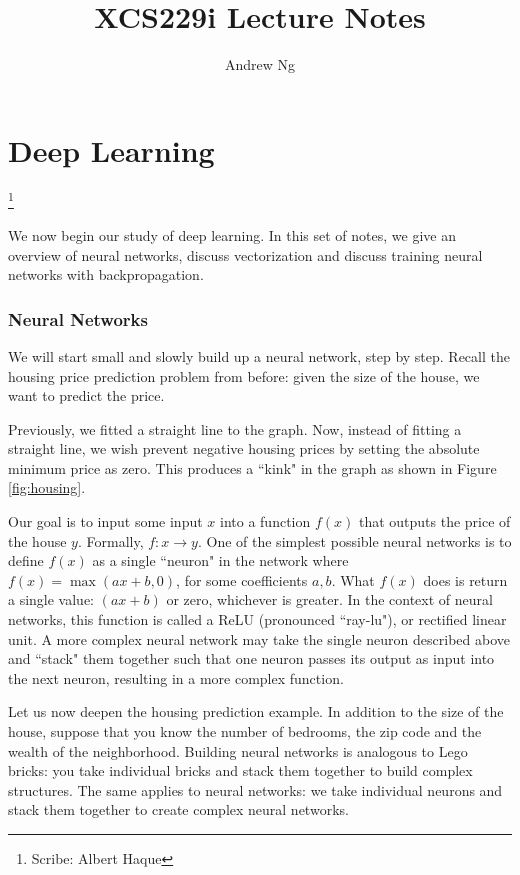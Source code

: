 \documentclass{article}
\numberwithin{equation}{section}
\newcommand\blfootnote[1]{%
	\begingroup
	\renewcommand\thefootnote{}\footnote{#1}%
	\addtocounter{footnote}{-1}%
	\endgroup
}
\begin{document}
\title{XCS229i Lecture Notes}
\author{Andrew Ng}
\date{}
\maketitle

\part*{Deep Learning}\blfootnote{Scribe: Albert Haque}

\noindent We now begin our study of deep learning. In this set of notes, we give an overview of neural networks, discuss vectorization and discuss training neural networks with backpropagation. 

\section{Neural Networks}

We will start small and slowly build up a neural network, step by step. Recall the housing price prediction problem from before: given the size of the house, we want to predict the price.

Previously, we fitted a straight line to the graph. Now, instead of fitting a straight line, we wish prevent negative housing prices by setting the absolute minimum price as zero. This produces a ``kink" in the graph as shown in Figure \ref{fig:housing}.

Our goal is to input some input $x$ into a function $f(x)$ that outputs the price of the house $y$. Formally, $f: x \rightarrow y$. One of the simplest possible neural networks is to define $f(x)$ as a single ``neuron" in the network where $f(x) = \max(ax + b, 0)$, for some coefficients $a,b$. What $f(x)$ does is return a single value: $(ax + b)$ or zero, whichever is greater. In the context of neural networks, this function is called a ReLU (pronounced ``ray-lu"), or rectified linear unit.  A more complex neural network may take the single neuron described above and ``stack" them together such that one neuron passes its output as input into the next neuron, resulting in a more complex function.

Let us now deepen the housing prediction example. In addition to the size of the house, suppose that you know the number of bedrooms, the zip code and the wealth of the neighborhood. Building neural networks is analogous to Lego bricks: you take individual bricks and stack them together to build complex structures. The same applies to neural networks: we take individual neurons and stack them together to create complex neural networks.
\end{document}
